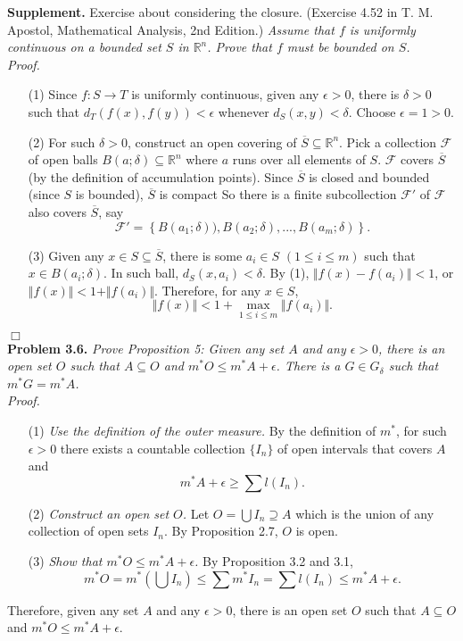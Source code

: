 \documentclass{article}
\begin{document}
\textbf{Supplement.}
Exercise about considering the closure.
(Exercise 4.52 in T. M. Apostol, Mathematical Analysis, 2nd Edition.)
\emph{Assume that $f$ is uniformly continuous on a bounded set $S$ in $\mathbb{R}^n$.
Prove that $f$ must be bounded on $S$.} \\

\emph{Proof.}
\begin{enumerate}
\item[(1)]
Since $f: S \rightarrow T$ is uniformly continuous,
given any $\epsilon > 0$, there is $\delta > 0$ such that
$d_T(f(x), f(y)) < \epsilon$ whenever $d_S(x, y) < \delta$.
Choose $\epsilon = 1 > 0$.
\item[(2)]
For such $\delta > 0$, construct an open covering of $\overline{S} \subseteq \mathbb{R}^n$.
Pick a collection $\mathscr{F}$ of open balls
$B(a;\delta) \subseteq \mathbb{R}^n$
where $a$ runs over all elements of $S$.
$\mathscr{F}$ covers $\overline{S}$ (by the definition of accumulation points).
Since $\overline{S} $ is closed and bounded (since $S$ is bounded),
$\overline{S}$ is compact
So there is a finite subcollection $\mathscr{F}'$ of $\mathscr{F}$
also covers $\overline{S}$, say
$$\mathscr{F}'
= \left\{B(a_1;\delta)), B(a_2;\delta), ..., B(a_m;\delta) \right\}.$$
\item[(3)]
Given any $x \in S \subseteq \overline{S}$,
there is some $a_i \in S$ $(1 \leq i \leq m)$ such that $x \in B(a_i;\delta)$.
In such ball, $d_S(x, a_i) < \delta$.
By (1), $\Vert f(x) - f(a_i) \Vert < 1$,
or $\Vert f(x) \Vert < 1 + \Vert f(a_i) \Vert$.
Therefore, for any $x \in S$,
$$\Vert f(x) \Vert < 1 + \max_{1 \leq i \leq m}{\Vert f(a_i) \Vert}.$$
\end{enumerate}
$\Box$ \\



\textbf{Problem 3.6.}
\emph{Prove Proposition 5:
Given any set $A$ and any $\epsilon > 0$,
there is an open set $O$ such that $A \subseteq O$
and $m^{*}O \leq m^{*}A + \epsilon$.
There is a $G \in G_{\delta}$ such that $m^{*}G = m^{*}A$.} \\

\emph{Proof.}
\begin{enumerate}
\item[(1)]
\emph{Use the definition of the outer measure.}
By the definition of $m^{*}$,
for such $\epsilon > 0$ there exists a countable collection
$\{ I_n \}$ of open intervals that covers $A$ and
$$m^{*} A + \epsilon \geq \sum l(I_n).$$
\item[(2)]
\emph{Construct an open set $O$.}
Let $O = \bigcup I_n \supseteq A$
which is the union of any collection of open sets $I_n$.
By Proposition 2.7, $O$ is open.
\item[(3)]
\emph{Show that $m^{*}O \leq m^{*}A + \epsilon$.}
By Proposition 3.2 and 3.1,
$$m^{*}O
= m^{*} \left( \bigcup I_n \right)
\leq \sum m^{*} I_n
= \sum l(I_n)
\leq m^{*} A + \epsilon.$$
\end{enumerate}
Therefore, given any set $A$ and any $\epsilon > 0$,
there is an open set $O$ such that $A \subseteq O$
and $m^{*}O \leq m^{*}A + \epsilon$.
\end{document}
